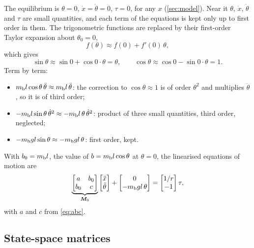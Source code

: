 The equilibrium is $\theta = 0$, $\dot x = \dot\theta = 0$, $\tau = 0$, for any
$x$ (\cref{sec:model}). Near it $\theta$, $\dot x$, $\dot\theta$ and $\tau$ are
small quantities, and each term of the equations is kept only up to first order
in them. The trigonometric functions are replaced by their first-order Taylor
expansion about $\theta_0 = 0$,
\begin{equation}
  f(\theta) \approx f(0) + f'(0)\,\theta ,
\end{equation}
which gives
\begin{equation}
  \sin\theta \approx \sin 0 + \cos 0\cdot\theta = \theta ,
  \qquad
  \cos\theta \approx \cos 0 - \sin 0\cdot\theta = 1 .
\end{equation}
Term by term:
\begin{itemize}
  \item $m_{\mathrm b} l\cos\theta\,\ddot\theta \approx m_{\mathrm b} l\,\ddot\theta$: the
        correction to $\cos\theta \approx 1$ is of order $\theta^2$ and
        multiplies $\ddot\theta$, so it is of third order;
  \item $-m_{\mathrm b} l\sin\theta\,\dot\theta^2 \approx -m_{\mathrm b} l\,\theta\,\dot\theta^2$:
        product of three small quantities, third order, neglected;
  \item $-m_{\mathrm b} g l\sin\theta \approx -m_{\mathrm b} g l\,\theta$: first order, kept.
\end{itemize}
With $b_0 = m_{\mathrm b} l$, the value of $b = m_{\mathrm b} l\cos\theta$ at $\theta = 0$, the
linearised equations of motion are
\begin{equation}
  \underbrace{\begin{bmatrix} a & b_0 \\ b_0 & c \end{bmatrix}}_{\bm{M}_0}
  \begin{bmatrix} \ddot x \\ \ddot\theta \end{bmatrix}
  + \begin{bmatrix} 0 \\ -m_{\mathrm b} g l\,\theta \end{bmatrix}
  = \begin{bmatrix} 1/r \\ -1 \end{bmatrix}\tau ,
  \label{eq:lin-eom}
\end{equation}
with $a$ and $c$ from \cref{eq:abc}.

\subsection{State-space matrices}

